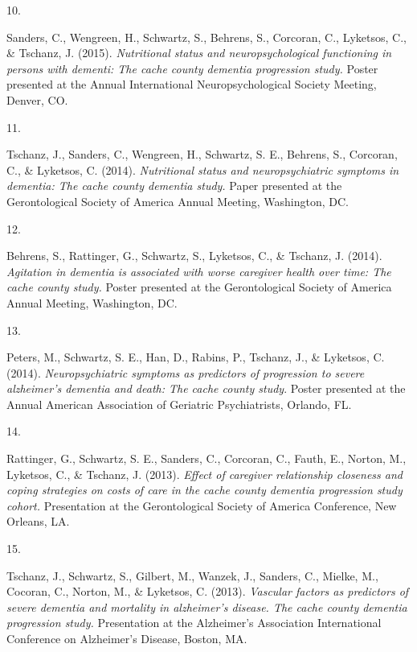 \documentclass[11pt,a4paper,]{moderncv}
\newlength{\csllabelwidth}
\newcommand{\CSLLeftMargin}[1]{\parbox[t]{\csllabelwidth}{#1}}
\newcommand{\CSLRightInline}[1]{\parbox[t]{\linewidth - \csllabelwidth}{#1}}
\begin{document}
\leavevmode\hypertarget{ref-saunders2015poster}{}%
\CSLLeftMargin{10. }
\CSLRightInline{Sanders, C., Wengreen, H., Schwartz, S., Behrens, S.,
Corcoran, C., Lyketsos, C., \& Tschanz, J. (2015). \emph{Nutritional
status and neuropsychological functioning in persons with dementi: The
cache county dementia progression study.} Poster presented at the Annual
International Neuropsychological Society Meeting, Denver, CO.}

\leavevmode\hypertarget{ref-joann2014poster}{}%
\CSLLeftMargin{11. }
\CSLRightInline{Tschanz, J., Sanders, C., Wengreen, H., Schwartz, S. E.,
Behrens, S., Corcoran, C., \& Lyketsos, C. (2014). \emph{Nutritional
status and neuropsychiatric symptoms in dementia: The cache county
dementia study.} Paper presented at the Gerontological Society of
America Annual Meeting, Washington, DC.}

\leavevmode\hypertarget{ref-behrens2014poster}{}%
\CSLLeftMargin{12. }
\CSLRightInline{Behrens, S., Rattinger, G., Schwartz, S., Lyketsos, C.,
\& Tschanz, J. (2014). \emph{Agitation in dementia is associated with
worse caregiver health over time: The cache county study.} Poster
presented at the Gerontological Society of America Annual Meeting,
Washington, DC.}

\leavevmode\hypertarget{ref-peters2014poster}{}%
\CSLLeftMargin{13. }
\CSLRightInline{Peters, M., Schwartz, S. E., Han, D., Rabins, P.,
Tschanz, J., \& Lyketsos, C. (2014). \emph{Neuropsychiatric symptoms as
predictors of progression to severe alzheimer's dementia and death: The
cache county study}. Poster presented at the Annual American Association
of Geriatric Psychiatrists, Orlando, FL.}

\leavevmode\hypertarget{ref-gail2013oral}{}%
\CSLLeftMargin{14. }
\CSLRightInline{Rattinger, G., Schwartz, S. E., Sanders, C., Corcoran,
C., Fauth, E., Norton, M., Lyketsos, C., \& Tschanz, J. (2013).
\emph{Effect of caregiver relationship closeness and coping strategies
on costs of care in the cache county dementia progression study cohort.}
Presentation at the Gerontological Society of America Conference, New
Orleans, LA.}

\leavevmode\hypertarget{ref-joann2013pres}{}%
\CSLLeftMargin{15. }
\CSLRightInline{Tschanz, J., Schwartz, S., Gilbert, M., Wanzek, J.,
Sanders, C., Mielke, M., Cocoran, C., Norton, M., \& Lyketsos, C.
(2013). \emph{Vascular factors as predictors of severe dementia and
mortality in alzheimer's disease. The cache county dementia progression
study.} Presentation at the Alzheimer's Association International
Conference on Alzheimer's Disease, Boston, MA.}
\end{document}
